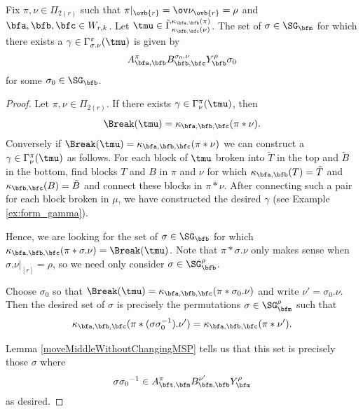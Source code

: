 \begin{lemma}\label{lem:number_of_sigma} Fix $\pi,\nu\in\Pi_{2(r)}$ such that $\pi|_{\ovb{r}}=\ov\nu_{\ovb{r}}=\rho$ and $\bfa,\bfb,\bfc\in W_{r,k}$. Let $\tmu\in\tilde{\Gamma}_{\kappa_{\bfb,\bfc}(\nu)}^{\kappa_{\bfa,\bfb}(\pi)}$. The set of $\sigma\in \SG_\bfm$ for which there exists a $\gamma\in\Gamma_{\sigma.\nu}^\pi(\tmu)$ is given by
\begin{align*}
    A_{\bfa,\bfb}^\pi B_{\bfb,\bfc}^{\sigma_0.\nu} Y_\bfb^\rho\sigma_0
\end{align*}
for some $\sigma_0\in \SG_\bfb$.
\end{lemma}

\begin{proof}

Let $\pi,\nu\in\Pi_{2(r)}$. If there exists $\gamma\in\Gamma^\pi_\nu(\tmu)$, then \[\Break(\tmu)=\kappa_{\bfa,\bfb,\bfc}(\pi\ast\nu).\] Conversely if $\Break(\tmu)=\kappa_{\bfa,\bfb,\bfc}(\pi\ast\nu)$ we can construct a $\gamma\in\Gamma_\nu^\pi(\tmu)$ as follows. For each block of $\tmu$ broken into $\tilde T$ in the top and $\tilde B$ in the bottom, find blocks $T$ and $B$ in $\pi$ and $\nu$ for which $\kappa_{\bfa,\bfb}(T)=\tilde T$ and $\kappa_{\bfb,\bfc}(B)=\tilde B$ and connect these blocks in $\pi\ast\nu$. After connecting such a pair for each block broken in $\mu$, we have constructed the desired $\gamma$ (see Example \ref{ex:form_gamma}).

Hence, we are looking for the set of $\sigma\in\SG_\bfb$ for which $\kappa_{\bfa,\bfb,\bfc}(\pi\ast\sigma.\nu)=\Break(\tmu)$. Note that $\pi\ast\sigma.\nu$ only makes sense when $\sigma.\nu|_{[r]}=\rho$, so we need only consider $\sigma\in \SG_\bfb^\rho$.

Choose $\sigma_0$ so that $\Break(\tmu)=\kappa_{\bfa,\bfb,\bfc}(\pi\ast\sigma_0.\nu)$ and write $\nu'=\sigma_0.\nu$. Then the desired set of $\sigma$ is precisely the permutations $\sigma\in \SG_\bfm^\rho$ such that \begin{align*}
     \kappa_{\bfa,\bfb,\bfc}(\pi\ast(\sigma\sigma_0^{-1}).\nu')=\kappa_{\bfa,\bfb,\bfc}(\pi\ast\nu').
\end{align*}

Lemma \ref{moveMiddleWithoutChangingMSP} tells us that this set is precisely those $\sigma$ where \begin{align*}
    \sigma{\sigma_0}^{-1}\in A_{\bft,\bfm}^\pi B_{\bfm,\bfb}^{\nu'}Y_\bfm^\rho
\end{align*} as desired.
\end{proof}


